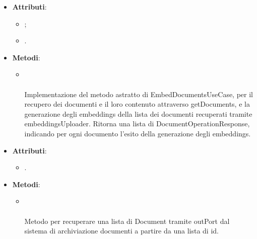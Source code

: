 \documentclass[10pt, a4paper]{article}
\begin{document}
\label{EmbedDocumentsServiceDettaglio}
\begin{itemize}
    \item \textbf{Attributi}:
    \begin{itemize}
        \item {};
        \item {}.
    \end{itemize}
    \item \textbf{Metodi}:
    \begin{itemize}
        \item {}\\ \\
        Implementazione del metodo astratto di EmbedDocumentsUseCase, per il recupero dei documenti e il loro contenuto attraverso getDocuments, e la generazione degli embeddings della lista dei documenti recuperati tramite embeddingsUploader. Ritorna una lista di DocumentOperationResponse, indicando per ogni documento l'esito della generazione degli embeddings.
    \end{itemize}
\end{itemize}

\label{GetDocumentsDettaglio}
\begin{itemize}
    \item \textbf{Attributi}:
    \begin{itemize}
        \item {}.
    \end{itemize}
    \item \textbf{Metodi}:
    \begin{itemize}
        \item {}\\ \\
        Metodo per recuperare una lista di Document tramite outPort dal sistema di archiviazione documenti a partire da una lista di id.
    \end{itemize}
\end{itemize}
\end{document}
